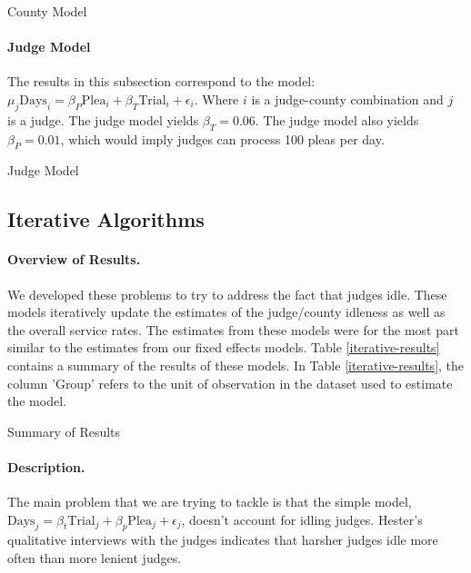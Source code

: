 \documentclass[11pt, oneside]{article}   	%
\theoremstyle{ModifiedStyle}
\begin{document}
		    \begin{table}[H]
		      \centering
		      \caption{County Model}
		      
		    \end{table}

		  \paragraph{Judge Model}
		    The results in this subsection correspond to the model: $\mu_j \text{Days}_i = \beta_P \text{Plea}_i + \beta_T \text{Trial}_i + \epsilon_i$. Where $i$ is a judge-county combination and $j$ is a judge. The judge model yields $\beta_T=0.06$. The judge model also yields $\beta_P=0.01$, which would imply judges can process 100 pleas per day.

		    \begin{table}[H]
		      \centering
		      \small
		      \caption{Judge Model}
		      
		    \end{table}

	\subsection{Iterative Algorithms}
	  \paragraph{Overview of Results.} We developed these problems to try to address the fact that judges idle. These models iteratively update the estimates of the judge/county idleness as well as the overall service rates. The estimates from these models were for the most part similar to the estimates from our fixed effects models. Table \ref{iterative-results} contains a summary of the results of these models. In Table \ref{iterative-results}, the column 'Group' refers to the unit of observation in the dataset used to estimate the model.

		\begin{table}[H]
	    \centering
	    \caption{Summary of Results}
			\label{iterative-results}
	    
	  \end{table}

		\paragraph{Description.}
	  The main problem that we are trying to tackle is that the simple model, $\text{Days}_j = \beta_t \text{Trial}_j + \beta_p\text{Plea}_j +\epsilon_j$, doesn't account for idling judges. Hester's qualitative interviews with the judges indicates that harsher judges idle more often than more lenient judges.
\end{document}
